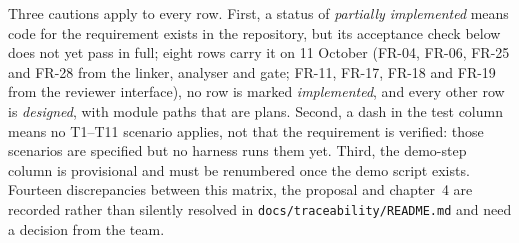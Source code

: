 Three cautions apply to every row. First, a status of \emph{partially
implemented} means code for the requirement exists in the repository, but its acceptance check below does not yet pass in full; eight rows
carry it on 11 October (FR-04, FR-06, FR-25 and FR-28 from the linker,
analyser and gate; FR-11, FR-17, FR-18 and FR-19 from the reviewer
interface), no row is marked \emph{implemented}, and every other row is
\emph{designed}, with module paths that are plans.
Second, a dash in the test column means no T1--T11 scenario applies, not that the
requirement is verified: those scenarios are specified but no harness runs them
yet. Third, the demo-step column is provisional and must be renumbered once the
demo script exists. Fourteen discrepancies between this matrix, the proposal and
chapter~4 are recorded rather than silently resolved in
\texttt{docs/traceability/README.md} and need a decision from the team.

\begin{landscape}

\end{landscape}
